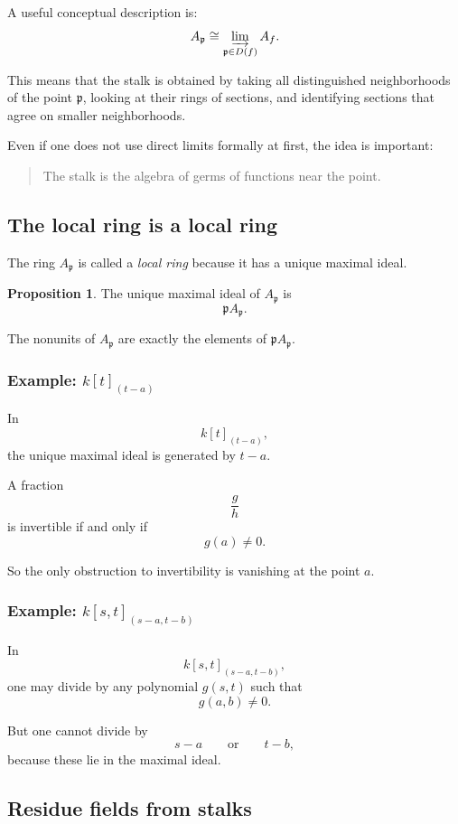 \documentclass[12pt,a4paper]{article}
\theoremstyle{notespace}
\newcommand{\mf}{\mathfrak}
\theoremstyle{definition}
\newtheorem{proposition}[definition]{Proposition}
\begin{document}
A useful conceptual description is:
\[
A_{\mf p}\cong \varinjlim_{\mf p\in D(f)} A_f.
\]

This means that the stalk is obtained by taking all distinguished neighborhoods of the point \(\mf p\), looking at their rings of sections, and identifying sections that agree on smaller neighborhoods.

Even if one does not use direct limits formally at first, the idea is important:

\begin{quote}
	The stalk is the algebra of germs of functions near the point.
\end{quote}

\subsection{The local ring is a local ring}

The ring \(A_{\mf p}\) is called a \emph{local ring} because it has a unique maximal ideal.

\begin{proposition}
	The unique maximal ideal of \(A_{\mf p}\) is
	\[
	\mf p A_{\mf p}.
	\]
\end{proposition}

The nonunits of \(A_{\mf p}\) are exactly the elements of \(\mf p A_{\mf p}\).

\subsubsection{Example: \(k[t]_{(t-a)}\)}

In
\[
k[t]_{(t-a)},
\]
the unique maximal ideal is generated by \(t-a\).

A fraction
\[
\frac{g}{h}
\]
is invertible if and only if
\[
g(a)\neq 0.
\]

So the only obstruction to invertibility is vanishing at the point \(a\).

\subsubsection{Example: \(k[s,t]_{(s-a,t-b)}\)}

In
\[
k[s,t]_{(s-a,t-b)},
\]
one may divide by any polynomial \(g(s,t)\) such that
\[
g(a,b)\neq 0.
\]

But one cannot divide by
\[
s-a
\qquad\text{or}\qquad
t-b,
\]
because these lie in the maximal ideal.

\subsection{Residue fields from stalks}
\end{document}
